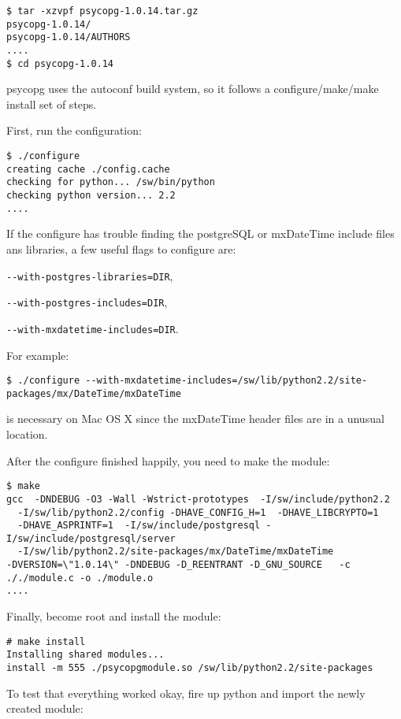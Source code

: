 \documentclass{article}
\begin{document}
\begin{verbatim}
$ tar -xzvpf psycopg-1.0.14.tar.gz 
psycopg-1.0.14/
psycopg-1.0.14/AUTHORS
....
$ cd psycopg-1.0.14
\end{verbatim}

psycopg uses the autoconf build system, so it follows a
configure/make/make install set of steps.

First, run the configuration:

\begin{verbatim}
$ ./configure
creating cache ./config.cache
checking for python... /sw/bin/python
checking python version... 2.2
....
\end{verbatim}

If the configure has trouble finding the postgreSQL or mxDateTime
include files ans libraries, a few useful flags to configure are:

\verb|--with-postgres-libraries=DIR|,

\verb|--with-postgres-includes=DIR|,

\verb|--with-mxdatetime-includes=DIR|. 

For example:

\begin{verbatim}
$ ./configure --with-mxdatetime-includes=/sw/lib/python2.2/site-packages/mx/DateTime/mxDateTime
\end{verbatim}

is necessary on Mac OS X since the mxDateTime header files are in a
unusual location.

After the configure finished happily, you need to make the module:

\begin{verbatim}
$ make
gcc  -DNDEBUG -O3 -Wall -Wstrict-prototypes  -I/sw/include/python2.2
  -I/sw/lib/python2.2/config -DHAVE_CONFIG_H=1  -DHAVE_LIBCRYPTO=1
  -DHAVE_ASPRINTF=1  -I/sw/include/postgresql -I/sw/include/postgresql/server
  -I/sw/lib/python2.2/site-packages/mx/DateTime/mxDateTime
-DVERSION=\"1.0.14\" -DNDEBUG -D_REENTRANT -D_GNU_SOURCE   -c
././module.c -o ./module.o
....
\end{verbatim}

Finally, become root and install the module:

\begin{verbatim}
# make install
Installing shared modules...
install -m 555 ./psycopgmodule.so /sw/lib/python2.2/site-packages
\end{verbatim}

To test that everything worked okay, fire up python and import the newly
created module:
\end{document}

